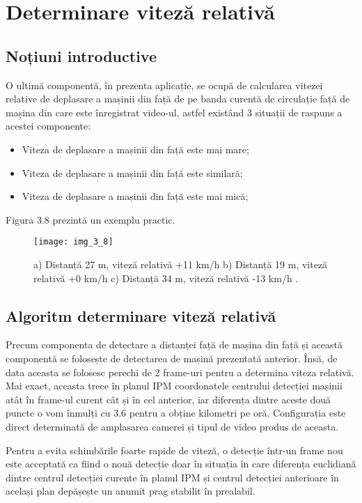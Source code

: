 \section{Determinare viteză relativă}
\subsection{Noțiuni introductive}

O ultimă componentă, în prezenta aplicație, se ocupă de calcularea vitezei relative de deplasare a mașinii din față de pe banda curentă de circulație față de mașina din care este înregistrat video-ul, astfel existând 3 situații de raspuns a acestei componente:

\begin{itemize}
	\item Viteza de deplasare a mașinii din față este mai mare;
	\item Viteza de deplasare a mașinii din față este similară;
	\item Viteza de deplasare a mașinii din față este mai mică;
\end{itemize}

Figura 3.8 prezintă un exemplu practic.
\begin{figure}[!h]
	\centering
	\texttt{[image: img\_3\_8]}
	\caption[Determinare distanță și viteză]{a) Distanță 27 m, viteză relativă +11 km/h b) Distanță 19 m, viteză relativă +0 km/h c) Distanță 34 m, viteză relativă -13 km/h .}
\end{figure}

\subsection{Algoritm determinare viteză relativă}

Precum componenta de detectare a distanței față de mașina din față și această componentă se folosește de detectarea de mașină prezentată anterior. Însă, de data aceasta se folosesc perechi de 2 frame-uri pentru a determina viteza relativă. Mai exact, aceasta trece în planul IPM coordonatele centrului detecției mașinii atât în frame-ul curent cât și în cel anterior, iar diferența dintre aceste două puncte o vom înmulți cu 3.6 pentru a obține kilometri pe oră. Configurația este direct determinată de amplasarea camerei și tipul de video produs de aceasta. 

Pentru a evita schimbările foarte rapide de viteză, o detecție într-un frame nou este acceptată ca fiind o nouă detecție doar în situația în care diferența euclidiană dintre centrul detecției curente în planul IPM și centrul detecției anterioare în același plan depășește un anumit prag stabilit în prealabil.